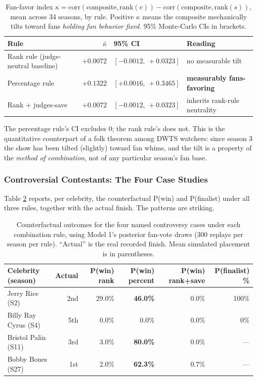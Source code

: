 \documentclass{article}
\begin{document}
\begin{table}[H]
\centering
\caption{Fan-favor index $\kappa = \mathrm{corr}(\text{composite}, \mathrm{rank}(v)) - \mathrm{corr}(\text{composite}, \mathrm{rank}(s))$, mean across 34 seasons, by rule. Positive $\kappa$ means the composite mechanically tilts toward fans \emph{holding fan behavior fixed}. 95\% Monte-Carlo CIs in brackets.}
\label{tab:m2-kappa}
\begin{tabular}{lrll}
\toprule
Rule & $\bar\kappa$ & 95\% CI & Reading \\
\midrule
Rank rule (judge-neutral baseline) & $+0.0072$ & $[-0.0012,\ +0.0323]$ & no measurable tilt \\
Percentage rule & $+0.1322$ & $[+0.0016,\ +0.3465]$ & \textbf{measurably fans-favoring} \\
Rank + judges-save & $+0.0072$ & $[-0.0012,\ +0.0323]$ & inherits rank-rule neutrality \\
\bottomrule
\end{tabular}
\end{table}

The percentage rule's CI excludes 0; the rank rule's does not. This is the quantitative counterpart of a folk theorem among DWTS watchers: since season 3 the show has been tilted (slightly) toward fan whims, and the tilt is a property of the \emph{method of combination}, not of any particular season's fan base.

\subsubsection{Controversial Contestants: The Four Case Studies}

Table \ref{tab:m2-controversy} reports, per celebrity, the counterfactual P(win) and P(finalist) under all three rules, together with the actual finish. The patterns are striking.

\begin{table}[H]
\centering
\caption{Counterfactual outcomes for the four named controversy cases under each combination rule, using Model 1's posterior fan-vote draws (300 replays per season per rule). ``Actual'' is the real recorded finish. Mean simulated placement is in parentheses.}
\label{tab:m2-controversy}
\begin{tabular}{lrrrrr}
\toprule
Celebrity (season) & Actual & P(win) rank & P(win) percent & P(win) rank+save & P(finalist) \% \\
\midrule
Jerry Rice (S2)      & 2nd & 29.0\% & \textbf{46.0\%} & 0.0\%  & 100\% \\
Billy Ray Cyrus (S4) & 5th & 0.0\%  & 0.0\%          & 0.0\%   & 0\%   \\
Bristol Palin (S11)  & 3rd & 3.0\%  & \textbf{80.0\%} & 0.0\%  & ---   \\
Bobby Bones (S27)    & 1st & 2.0\%  & \textbf{62.3\%} & 0.7\%  & ---   \\
\bottomrule
\end{tabular}
\end{table}
\end{document}
